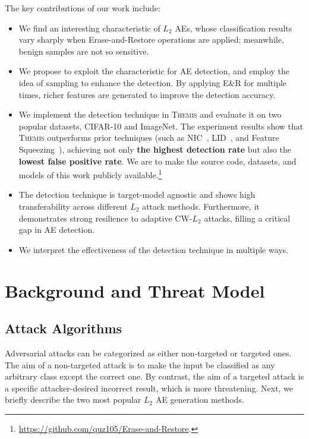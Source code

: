 \documentclass[sigconf]{acmart}
\newcommand{\oursys}{\textsc{Themis}\xspace}
\begin{document}
The key contributions of our work include:

\begin{itemize}

\item We find an interesting characteristic of $L_2$ AEs, whose classification 
results vary sharply when Erase-and-Restore operations are applied; 
meanwhile, benign samples are not so sensitive. 

\item We propose to exploit
the characteristic for AE detection, and employ the idea of sampling to enhance 
the detection. By applying E\&R for multiple times, 
richer features are generated to improve the detection accuracy.

\item We implement the detection technique in \oursys and evaluate it
on two popular datasets, CIFAR-10 and ImageNet. The experiment results show that \oursys outperforms prior techniques (such as NIC~\cite{ma2019nic}, LID~\cite{ma2018characterizing}, and Feature Squeezing~\cite{xu2017feature}), achieving not only
\textbf{the highest detection rate} but also the \textbf{lowest false positive
rate}. We are to make the source code, 
datasets, and models of this work publicly available.\footnote{\url{https://github.com/quz105/Erase-and-Restore}.}


\item The detection technique is target-model agnostic and shows high transferability across different $L_2$ attack methods. Furthermore, it demonstrates strong resilience to adaptive CW-$L_2$ attacks, filling
a critical gap in AE detection.

\item We interpret the effectiveness of 
the detection technique in multiple ways.

\end{itemize}



\section{Background and Threat Model}\label{sec:bck}

\subsection{Attack Algorithms}

Adversarial attacks can be 
categorized as either non-targeted or targeted ones. The aim of
a non-targeted attack is to make the input be classified as any
arbitrary class except the correct one. By contrast, the aim
of a targeted attack is a specific attacker-desired incorrect
result, which is more threatening.
Next, we briefly describe the two most popular $L_2$ AE generation methods.
\end{document}
